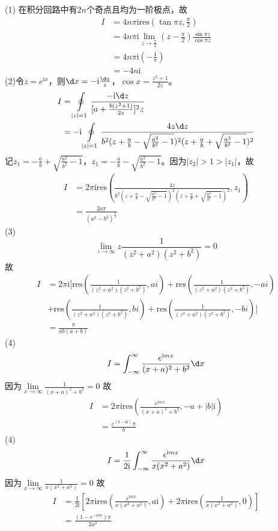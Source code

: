\documentclass{phyasgn}
\renewcommand{\i}{\mathrm{i}}
\newcommand{\res}{\text{res}}
\begin{document}
\begin{sol}[1]
(1)
在积分回路中有$2n$个奇点且均为一阶极点，故
\begin{align*}
    I&=4n\pi \i \res(\tan\pi z,\frac{\pi}{2})\\
    &=4n\pi \i \lim\limits_{z\to\frac{\pi}{2}}(z-\frac{\pi}{2})\frac{\sin\pi z}{\cos\pi z}\\
    &=4n\pi \i (-\frac{1}{\pi})\\
    &=-4n\i
\end{align*}
(2)令$z=e^{\i x}$，则$\d x=-\i\frac{\d z}{z}$，$\cos x=\frac{z^2+1}{2z}$。
\begin{align*}
    I&=\oint\limits_{|z|=1}\frac{-\i \d z}{[a+\frac{b(z^2+1)}{2z}]^2z}\\
    &=-\i\oint\limits_{|z|=1}\frac{4z\d z}{b^2(z+\frac{a}{b}-\sqrt{\frac{a^2}{b^2}-1})^2(z+\frac{a}{b}+\sqrt{\frac{a^2}{b^2}-1})^2}\\
\end{align*}
记$z_1=-\frac{a}{b}+\sqrt{\frac{a^2}{b^2}-1}$，$z_1=-\frac{a}{b}-\sqrt{\frac{a^2}{b^2}-1}$。因为$|z_2|>1>|z_1|$，故
\begin{align*}
    I&=2\pi \i\res(\frac{4z}{b^2(z+\frac{a}{b}-\sqrt{\frac{a^2}{b^2}-1})^2(z+\frac{a}{b}+\sqrt{\frac{a^2}{b^2}-1})^2},z_1)\\
    &=\frac{2a\pi}{(a^2-b^2)^{\frac{3}{2}}}
\end{align*}
(3)$$\lim\limits_{z\to\infty}z\frac{1}{(z^2+a^2)(z^2+b^2)}=0$$
故\begin{align*}
    I&=2\pi \i[\res(\frac{1}{(z^2+a^2)(z^2+b^2)},ai)+\res(\frac{1}{(z^2+a^2)(z^2+b^2)},-ai)\\
    &+\res(\frac{1}{(z^2+a^2)(z^2+b^2)},bi)+\res(\frac{1}{(z^2+a^2)(z^2+b^2)},-bi)]\\
    &=\frac{\pi}{ab(a+b)}
\end{align*}
(4)\begin{align*}
    I&=\int_{-\infty}^{\infty}\frac{e^{\i mx}}{(x+a)^2+b^2}\d x\\
\end{align*}
因为$\lim\limits_{x\to\infty}\frac{1}{(x+a)^2+b^2}=0$
故\begin{align*}
    I&=2\pi \i\res(\frac{e^{\i mx}}{(x+a)^2+b^2},-a+|b|\i)\\
    &=\frac{e^{(b-a\i)}\pi}{b}
\end{align*}
(4)\begin{align*}
    I&=\frac{1}{2\i}\int_{-\infty}^{\infty}\frac{e^{\i mx}}{x(x^2+a^2)}\d x\\
\end{align*}
因为$\lim\limits_{x\to\infty}\frac{1}{x(x^2+a^2)}=0$
故\begin{align*}
    I&=\frac{1}{2\i}[2\pi \i\res(\frac{e^{\i mx}}{x(x^2+a^2)},a\i)+2\pi \i\res(\frac{1}{x(x^2+a^2)},0)]\\
    &=\frac{(1-e^{-am})\pi}{2a^2}
\end{align*}
\end{sol}\par
\end{document}

